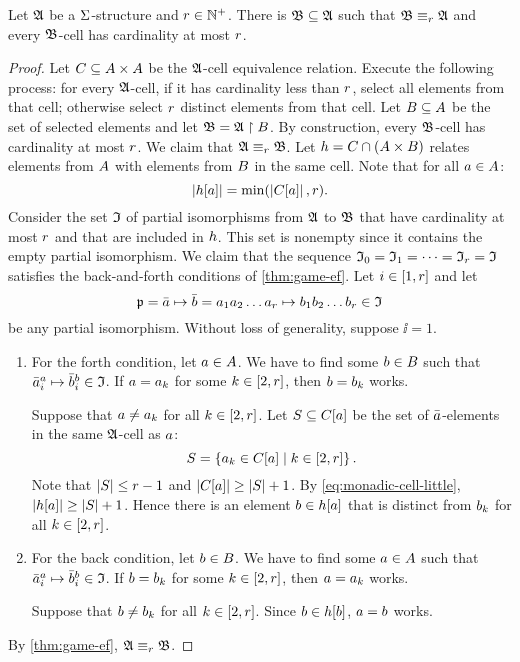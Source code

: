 \begin{lemma}\label{lem:monadic-cell-r}
Let $\mathfrak{A}$ be a $\mathrm{\Sigma}$-structure and $r \in \mathbb{N}^{+}$.
There is $\mathfrak{B} \subseteq \mathfrak{A}$ such that
$\mathfrak{B} \equiv_{r} \mathfrak{A}$ and every $\mathfrak{B}$-cell has cardinality at most $r$.
\end{lemma}
\begin{proof}
Let $C \subseteq {A\times A}$ be the $\mathfrak{A}$-cell equivalence relation.
Execute the following process: for every $\mathfrak{A}$-cell, if it has cardinality
less than $r$, select all elements from that cell;
otherwise select $r$ distinct elements from that cell.
Let $B \subseteq A$ be the set of selected elements and let
$\mathfrak{B} = \mathfrak{A} \restriction B$.
By construction, every $\mathfrak{B}$-cell has cardinality at most $r$.
We claim that $\mathfrak{A} \equiv_{r} \mathfrak{B}$.
Let $h = C \cap (A \times B)$ relates elements from $A$ with
elements from $B$ in the same cell.
Note that for all $a \in A$:
\begin{equation}\label{eq:monadic-cell-little}
  \left|h[a]\right| = \min(\left|C[a]\right|, r).
\end{equation}
Consider the set $\mathfrak{I}$ of partial isomorphisms from $\mathfrak{A}$ to $\mathfrak{B}$ that
have cardinality at most $r$ and that are included in $h$.
This set is nonempty since it contains the empty partial isomorphism.
We claim that the sequence $\mathfrak{I}_{0} = \mathfrak{I}_{1} = \dots = \mathfrak{I}_{r} = \mathfrak{I}$
satisfies the back-and-forth conditions of \cref{thm:game-ef}.
Let $i \in [1,r]$ and let 
\[
  \mathfrak{p} = \bar{a} \mapsto \bar{b} =
  a_{1}a_{2}\dots a_{r} \mapsto b_{1}b_{2}\dots b_{r} \in \mathfrak{I}
\]
be any partial isomorphism.
Without loss of generality, suppose $\ii = 1$.
\begin{enumerate}
  \item For the forth condition, let $a \in A$.
  We have to find some $b \in B$ such that
  $\bar{a}_{i}^{a} \mapsto \bar{b}_{i}^{b} \in \mathfrak{I}$.
  If $a = a_{k}$ for some $k \in [2,r]$, then $b = b_{k}$ works.
  
  Suppose that $a \neq a_{k}$ for all $k \in [2,r]$.
  Let $S \subseteq C[a]$ be the set of $\bar{a}$-elements in the same
  $\mathfrak{A}$-cell as $a$:
  \[
    S = \left\{a_{k} \in C[a]\mathrel{}\middle|\mathrel{}k \in [2,r]\right\}.
  \]
  Note that $\left|S\right| \leq r-1$ and
  $\left|C[a]\right| \geq \left|S\right| + 1$.
  By \cref{eq:monadic-cell-little}, $\left|h[a]\right| \geq \left|S\right| + 1$.
  Hence there is an element $b \in h[a]$ that is distinct from
  $b_{k}$ for all $k \in [2,r]$.
  \item For the back condition, let $b \in B$.
  We have to find some $a \in A$ such that
  $\bar{a}_{i}^{a} \mapsto \bar{b}_{i}^{b} \in \mathfrak{I}$.
  If $b = b_{k}$ for some $k \in [2,r]$, then $a = a_{k}$ works.
  
  Suppose that $b \neq b_{k}$ for all $k \in [2,r]$. Since $b \in
  h[b]$, $a = b$ works.
\end{enumerate}
By \cref{thm:game-ef}, $\mathfrak{A} \equiv_{r} \mathfrak{B}$.
\end{proof}